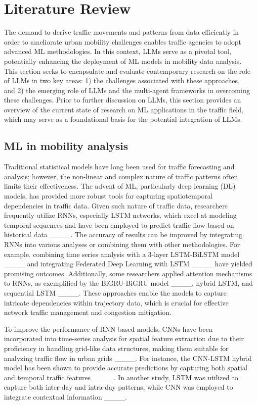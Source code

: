 \section{Literature Review}
The demand to derive traffic movements and patterns from data efficiently in order to ameliorate urban mobility challenges enables traffic agencies to adopt advanced ML methodologies. In this context, LLMs serve as a pivotal tool, potentially enhancing the deployment of ML models in mobility data analysis. This section seeks to encapsulate and evaluate contemporary research on the role of LLMs in two key areas: 1) the challenges associated with these approaches, and 2) the emerging role of LLMs and the multi-agent frameworks in overcoming these challenges. Prior to further discussion on LLMs, this section provides an overview of the current state of research on ML applications in the traffic field, which may serve as a foundational basis for the potential integration of LLMs.

\subsection{ML in mobility analysis}

Traditional statistical models have long been used for traffic forecasting and analysis; however, the non-linear and complex nature of traffic patterns often limits their effectiveness. The advent of ML, particularly deep learning (DL) models, has provided more robust tools for capturing spatiotemporal dependencies in traffic data. Given such nature of traffic data, researchers frequently utilize RNNs, especially LSTM networks, which excel at modeling temporal sequences and have been employed to predict traffic flow based on historical data ____. The accuracy of results can be improved by integrating RNNs into various analyses or combining them with other methodologies. For example, combining time series analysis with a 3-layer LSTM-BiLSTM model ____ and integrating Federated Deep Learning with LSTM ____ have yielded promising outcomes. Additionally, some researchers applied attention mechanisms to RNNs, as exemplified by the BiGRU-BiGRU model ____, hybrid LSTM, and sequential LSTM ____. These approaches enable the models to capture intricate dependencies within trajectory data, which is crucial for effective network traffic management and congestion mitigation.

To improve the performance of RNN-based models, CNNs have been incorporated into time-series analysis for spatial feature extraction due to their proficiency in handling grid-like data structures, making them suitable for analyzing traffic flow in urban grids ____. For instance, the CNN-LSTM hybrid model has been shown to provide accurate predictions by capturing both spatial and temporal traffic features ____. In another study, LSTM was utilized to capture both inter-day and intra-day patterns, while CNN was employed to integrate contextual information ____.

